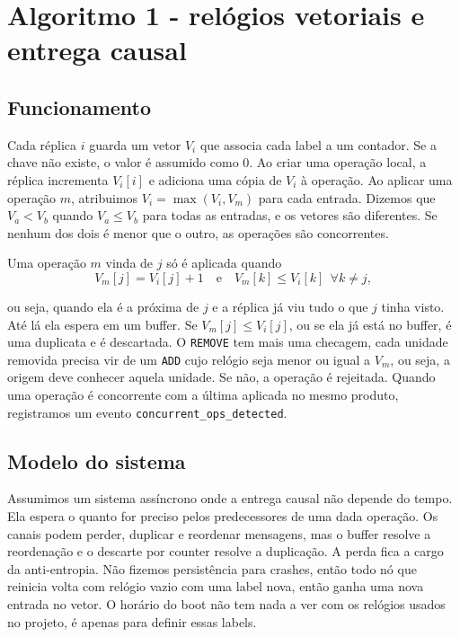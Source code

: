 \documentclass[conference,a4paper]{IEEEtran}
\begin{document}
\section{Algoritmo 1 - relógios vetoriais e entrega causal}\label{sec:alg1}
\subsection{Funcionamento}
Cada réplica $i$ guarda um vetor $V_i$ que associa cada label a um contador. Se a chave não existe, o valor é assumido como 0. Ao criar uma operação local, a réplica
incrementa $V_i[i]$ e adiciona uma cópia de $V_i$ à operação. Ao aplicar uma
operação $m$, atribuimos $V_i = \max(V_i, V_m)$ para cada entrada. Dizemos que
$V_a < V_b$ quando $V_a \le V_b$ para todas as entradas, e os vetores são
diferentes. Se nenhum dos dois é menor que o outro, as operações são concorrentes.

Uma operação $m$ vinda de $j$ só é aplicada quando
\begin{equation}
V_m[j] = V_i[j]+1 \quad\text{e}\quad V_m[k]\le V_i[k]\ \ \forall k\ne j,
\end{equation}

ou seja, quando ela é a próxima de $j$ e a réplica já viu tudo o que $j$ tinha
visto. Até lá ela espera em um buffer. Se $V_m[j]\le V_i[j]$, ou se ela já
está no buffer, é uma duplicata e é descartada. O \texttt{REMOVE} tem mais uma checagem, cada unidade removida precisa vir de um \texttt{ADD} cujo relógio seja menor ou igual a $V_m$, ou seja, a origem deve conhecer aquela unidade. Se não, a operação é rejeitada. Quando uma operação é concorrente com a última aplicada no mesmo produto, registramos um evento \texttt{concurrent\_ops\_detected}.

\subsection{Modelo do sistema}
Assumimos um sistema assíncrono onde a entrega causal não depende do tempo. Ela espera o quanto for preciso pelos predecessores de uma dada operação. Os canais podem perder, duplicar e reordenar mensagens, mas o buffer resolve a reordenação e o descarte por counter resolve a duplicação. A perda fica a cargo da anti-entropia. Não fizemos persistência para crashes, então todo nó que reinicia volta com relógio vazio com uma label nova, então ganha uma nova entrada no vetor. O horário do boot não tem nada a ver com os relógios usados no projeto, é apenas para definir essas labels.
\end{document}
